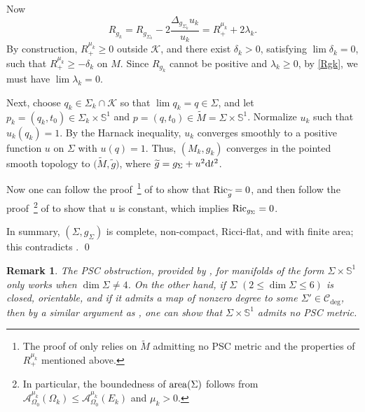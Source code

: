 \documentclass[10pt,a4paper]{amsart}
\numberwithin{equation}{section}
\newtheorem{Remark}[Theorem]{Remark} }
\def\S{\mathbb{S}}
\def\refOmega{\Omega_0}
\def\Acal{\mathcal{A}}
\def\Ccal{\mathcal{C}}
\def\Kcal{\mathcal{K}}
\def\ed{{\rm d}}
\def\Ric{{\rm Ric}}
\def\area{{\rm area}}
\begin{document}
Now
\begin{equation}\label{Rgk}
R_{g_{k}}=R_{g_{\Sigma_{k}}}-2\frac{\Delta_{g_{\Sigma_{k}}}u_{k}}{u_{k}}=R_{+}^{\mu_{k}}+2\lambda_{k}.
\end{equation}
By construction, $R_{+}^{\mu_{k}} \ge 0$ outside $\Kcal$, and
there exist $\delta_k>0$, satisfying $\lim\delta_k= 0$, such that $R_{+}^{\mu_{k}}\geq -\delta_{k}$ on $M$.
Since $R_{g_k}$ cannot be positive and $\lambda_k\ge 0$, by \eqref{Rgk}, we must have $\lim \lambda_{k}= 0$.

Next, choose $q_{k}\in \Sigma_{k}\cap \Kcal$ so that $\lim q_{k} = q\in\Sigma$, and let $p_{k}=(q_{k},t_{0})\in \Sigma_k\times \S^1$ and $p=(q,t_{0})\in \widetilde M=\Sigma\times \S^{1}$.
Normalize $u_{k}$ such that $u_{k}(q_{k})=1$. By the Harnack
inequality, $u_k$ converges smoothly to a positive function $u$ on $\Sigma$ with $u(q)= 1$.
Thus, $(M_k, g_k)$ converges in the pointed smooth topology to $\bigl(\widetilde M, \widetilde g\bigr)$, where $\widetilde g = g_{\Sigma}+ u^2\ed t^2$.

Now one can follow the proof\,%
\footnote{The proof of \cite[Proposition 3.2]{Zhu2020} only relies on $\widetilde M$ admitting no PSC metric and the properties of $R^{\mu_k}_+$ mentioned above.}
of \cite[Proposition 3.2]{Zhu2020} to show
that $\Ric_{\widetilde g} = 0$,
and then follow the proof\,%
\footnote{In particular, the boundedness of  $\area(\Sigma)$ follows from
$
	\Acal^{\mu_k}_{\refOmega}(\Omega_{k})\leq \Acal^{\mu_k}_{\refOmega}(E_{k})
$ and $\mu_{k}>0$.}
of \cite[Theorem 1.1]{Zhu2020} to show that $u$ is constant, which
implies $\Ric_{g_{\Sigma}}= 0$.

In summary, $(\Sigma, g_\Sigma)$ is complete, non-compact, Ricci-flat, and with finite area; this contradicts \cite[p.~25, Theorem 4.1]{Yau94}.
\qed


\begin{Remark}\label{warpProdRmk}
The PSC obstruction, provided by \cite[Corollary 1.10]{CRZ2022}, for manifolds of the form $\Sigma\times \S^1$ only works when $\dim\Sigma \ne 4$. On the other hand, if $\Sigma$
$(2\le\dim\Sigma\le 6)$ is closed, orientable, and if it admits a map of nonzero degree to some
$\Sigma'\in \Ccal_{\deg}$, then by a similar argument as \cite[Theorem 1.1]{CLSZ2021}, one can show that $\Sigma\times \S^{1}$ admits no PSC metric.
 \end{Remark}
\end{document}
